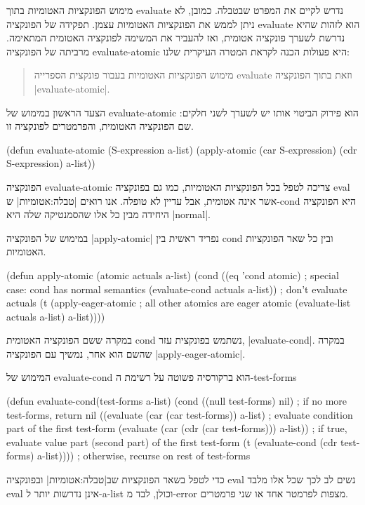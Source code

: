 מימוש הפונקציות האטומיות בתוך evaluate נדרש לקיים את המפרט שבטבלה. כמובן, לא
ניתן לממש את הפונקציות האטומיות עצמן. תפקידה של הפונקציה evaluate הוא לזהות
שהיא נדרשת לשערך פונקציה אטומית, ואז להעביר את המשימה לפונקציה האטומית המתאימה.
מרביתה של הפונקציה evaluate-atomic היא פעולות הכנה לקראת המטרה העיקרית שלנו:
\begin{quote}
  מימוש הפונקציות האטומיות בעבור פונקצית הספרייה evaluate וזאת בתוך הפונקציה
  \E|evaluate-atomic|.
\end{quote}

הצעד הראשון במימוש של evaluate-atomic הוא פירוק הביטוי אותו יש לשערך לשני
חלקים: שם הפונקציה האטומית, והפרמטרים לפונקציה זו.
\begin{KERNEL}
(defun evaluate-atomic (S-expression a-list)
  (apply-atomic (car S-expression) (cdr S-expression) a-list))
\end{KERNEL}

הפונקציה evaluate-atomic צריכה לטפל בכל הפונקציות האטומיות, כמו גם בפונקציה
eval אשר אינה אטומית, אבל עדיין לא טופלה. אנו רואים |טבלה:אטומיות| ש-cond
היא הפונקציה היחידה מבין כל אלו שהסמנטיקה שלה היא \E|normal|.

\minipage\textwidth
במימוש של הפונקציה \E|apply-atomic| נפריד ראשית בין cond ובין כל שאר הפונקציות
האטומיות.
\begin{KERNEL}
(defun apply-atomic (atomic actuals a-list)
  (cond ((eq 'cond atomic) ; special case: cond has normal semantics
            (evaluate-cond actuals a-list)) ; don't evaluate actuals
        (t (apply-eager-atomic ; all other atomics are eager
              atomic (evaluate-list actuals a-list) a-list))))
\end{KERNEL}
\endminipage

במקרה ששם הפונקציה האטומית cond נשתמש בפונקצית עזר, \E|evaluate-cond|. במקרה
שהשם הוא אחר, נמשיך עם הפונקציה \E|apply-eager-atomic|.

המימוש של evaluate-cond הוא ברקורסיה פשוטה על רשימת ה-test-forms
\begin{KERNEL}
(defun evaluate-cond(test-forms a-list)
  (cond ((null test-forms) nil) ; if no more test-forms, return nil
        ((evaluate (car (car test-forms)) a-list) ; evaluate condition part of the first test-form
        (evaluate (car (cdr (car test-forms))) a-list)) ; if true, evaluate value part (second part) of the first test-form
        (t (evaluate-cond (cdr test-forms) a-list)))) ; otherwise, recurse on rest of test-forms
\end{KERNEL}

כדי לטפל בשאר הפונקציות שב|טבלה:אטומיות| ובפונקציה eval נשים לב לכך שכל אלו
מלבד eval אינן נדרשות יותר ל-a-list וכולן, לבד מ-error מצפות לפרמטר אחד או שני
פרמטרים.

